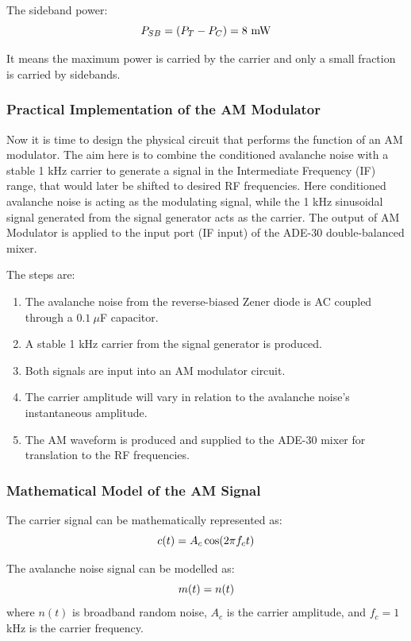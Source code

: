 \documentclass[12pt,a4paper]{report}
\begin{document}
	The sideband power:
	\begingroup
	\setlength{\mathindent}{0pt}
	\begin{equation*}
		\hfill
		P_{SB} = (P_T - P_C) = 8\ \text{mW}
		\hfill
	\end{equation*}
	\endgroup
	
	It means the maximum power is carried by the carrier and only a small fraction is carried by sidebands.
	\subsubsection{Practical Implementation of the AM Modulator}
	Now it is time to design the physical circuit that performs the function of an AM modulator. The aim here is to combine the conditioned avalanche noise with a stable 1 kHz carrier to generate a signal in the Intermediate Frequency (IF) range, that would later be shifted to desired RF frequencies. Here conditioned avalanche noise is acting as the modulating signal, while the 1 kHz sinusoidal signal generated from the signal generator acts as the carrier. The output of AM Modulator is applied to the input port (IF input) of the ADE-30 double-balanced mixer.
	
	The steps are:
	\begin{enumerate}
		\item The avalanche noise from the reverse-biased Zener diode is AC coupled through a $0.1\ \mu$F capacitor.
		\item A stable 1 kHz carrier from the signal generator is produced.
		\item Both signals are input into an AM modulator circuit.
		\item The carrier amplitude will vary in relation to the avalanche noise's instantaneous amplitude.
		\item The AM waveform is produced and supplied to the ADE-30 mixer for translation to the RF frequencies.
	\end{enumerate}
	\subsubsection{Mathematical Model of the AM Signal}
	The carrier signal can be mathematically represented as:
	\begingroup
	\setlength{\mathindent}{0pt}
	\begin{equation*}
		\hfill
		c(t) = A_c \cos(2\pi f_c t)
		\hfill
	\end{equation*}
	\endgroup
	
	The avalanche noise signal can be modelled as:
	\begingroup
	\setlength{\mathindent}{0pt}
	\begin{equation*}
		\hfill
		m(t) = n(t)
		\hfill
	\end{equation*}
	\endgroup
	where $n(t)$ is broadband random noise, $A_c$ is the carrier amplitude, and $f_c = 1$ kHz is the carrier frequency.
	
\end{document}
